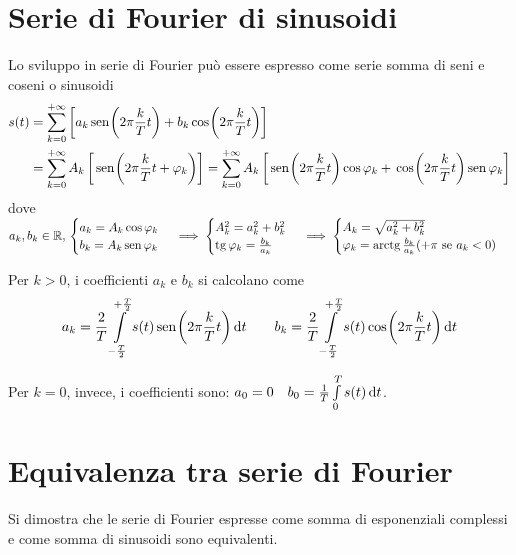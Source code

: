 \section{Serie di Fourier di sinusoidi}
Lo sviluppo in serie di Fourier può essere espresso come serie somma di seni e coseni o sinusoidi
\begin{align*}
	s(t)&=\sum_{k=0}^{+\infty}\left[ a_k \,{\operatorname{sen}}^{}\!\left({2\pi\frac{k}{T}t}\right) + b_k \,{\operatorname{cos}}^{}\!\left({2\pi\frac{k}{T}t}\right)\right] \\
	&=\sum_{k=0}^{+\infty}A_k\left[\,{\operatorname{sen}}^{}\!\left({2\pi\frac{k}{T}t+\varphi_k}\right)\right] =\sum_{k=0}^{+\infty}A_k\left[\,{\operatorname{sen}}^{}\!\left({2\pi\frac{k}{T}t}\right)\operatorname{cos}\varphi_k +\,{\operatorname{cos}}^{}\!\left({2\pi\frac{k}{T}t}\right)\operatorname{sen}\varphi_k \right]
\end{align*}
dove $a_k,b_k \in\mathbb{R},\,\begin{cases}
	a_k=A_k\operatorname{cos}\varphi_k \\
	b_k=A_k\operatorname{sen}\varphi_k
\end{cases}\implies\begin{cases}
	A_k^2=a_k^2+b_k^2\\
	\operatorname{tg}\varphi_k=\frac{b_k}{a_k}
\end{cases}\implies\begin{cases}
	A_k=\sqrt{a_k^2+b_k^2}\\
	\varphi_k=\operatorname{arctg}\frac{b_k}{a_k}(+\pi\text{ se }a_k<0)
\end{cases}$

Per $k>0$, i coefficienti $a_k$ e $b_k$ si calcolano come
\[
	a_k=\frac{2}{T}\int\limits_{-\frac{T}{2}}^{+\frac{T}{2}}{s(t)\,{\operatorname{sen}}^{}\!\left({2\pi\frac{k}{T}t}\right)}{\,\mathop{}\!\mathrm{d}{t}} \qquad b_k=\frac{2}{T}\int\limits_{-\frac{T}{2}}^{+\frac{T}{2}}{s(t)\,{\operatorname{cos}}^{}\!\left({2\pi\frac{k}{T}t}\right)}{\,\mathop{}\!\mathrm{d}{t}}
\]

Per $k=0$, invece, i coefficienti sono: $a_0=0 \quad b_0=\frac{1}{T}\int\limits_{0}^{T}{s(t)}{\,\mathop{}\!\mathrm{d}{t}}$.

\section{Equivalenza tra serie di Fourier}
Si dimostra che le serie di Fourier espresse come somma di esponenziali complessi e come somma di sinusoidi sono equivalenti.

